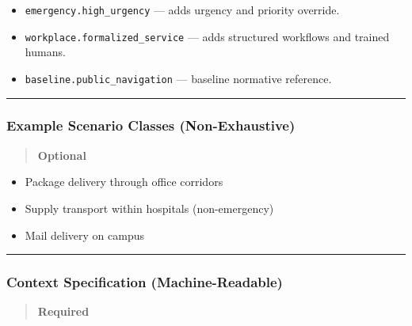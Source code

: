 \documentclass[utf8]{frontiers_suppmat} %
\providecommand{\tightlist}{%
  \setlength{\itemsep}{0pt}\setlength{\parskip}{0pt}}
\begin{document}
\begin{itemize}
\tightlist
\item
  \texttt{emergency.high\_urgency} --- adds urgency and priority
  override.
\item
  \texttt{workplace.formalized\_service} --- adds structured workflows
  and trained humans.
\item
  \texttt{baseline.public\_navigation} --- baseline normative reference.
\end{itemize}

\begin{center}\rule{0.5\linewidth}{0.5pt}\end{center}

\subsubsection{Example Scenario Classes
(Non-Exhaustive)}\label{example-scenario-classes-non-exhaustive}

\begin{quote}
\textbf{Optional}
\end{quote}

\begin{itemize}
\tightlist
\item
  Package delivery through office corridors
\item
  Supply transport within hospitals (non-emergency)
\item
  Mail delivery on campus
\end{itemize}

\begin{center}\rule{0.5\linewidth}{0.5pt}\end{center}

\subsubsection{Context Specification
(Machine-Readable)}\label{context-specification-machine-readable}

\begin{quote}
\textbf{Required}
\end{quote}
\end{document}
